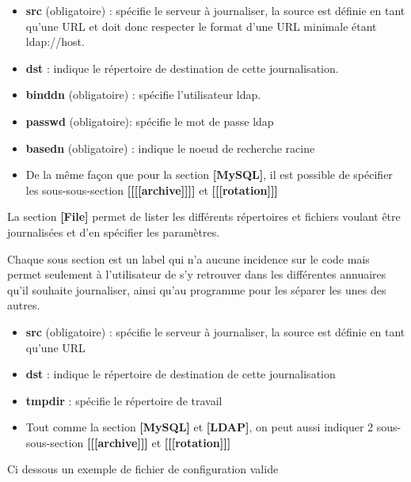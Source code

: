 \begin{itemize}
\item \textbf{src} (obligatoire) : spécifie le serveur à journaliser, la source est définie en tant qu'une URL et doit donc respecter le format  d'une URL minimale étant ldap://host.
\item  \textbf{dst}  : indique le répertoire de destination de cette journalisation.
\item \textbf{binddn} (obligatoire) : spécifie l'utilisateur ldap.
\item \textbf{passwd} (obligatoire): spécifie le mot de passe ldap
\item \textbf{basedn} (obligatoire) : indique le noeud de recherche racine
\item De la même façon que pour la section \textbf{[MySQL]}, il est possible de spécifier les sous-sous-section \textbf{[[[[archive]]]] }et \textbf{[[[rotation]]]}
\end{itemize}

La section \textbf{[File]} permet de lister les différents répertoires et fichiers voulant être journalisées et d'en spécifier les paramètres.

Chaque sous section est un label qui n'a aucune incidence sur le code mais permet seulement à l'utilisateur de s'y retrouver dans les différentes annuaires qu'il souhaite journaliser, ainsi qu'au programme pour les séparer les unes des autres.

\begin{itemize}
\item \textbf{src} (obligatoire) : spécifie le serveur à journaliser, la source est définie en tant qu'une URL  
\item \textbf{dst} : indique le répertoire de destination de cette journalisation
\item \textbf{tmpdir} : spécifie le répertoire de travail
\item Tout comme la section \textbf{[MySQL]} et \textbf{[LDAP]}, on peut aussi indiquer 2 sous-sous-section \textbf{[[[archive]]]} et \textbf{[[[rotation]]]}
\end{itemize}


Ci dessous un exemple de fichier de configuration valide


